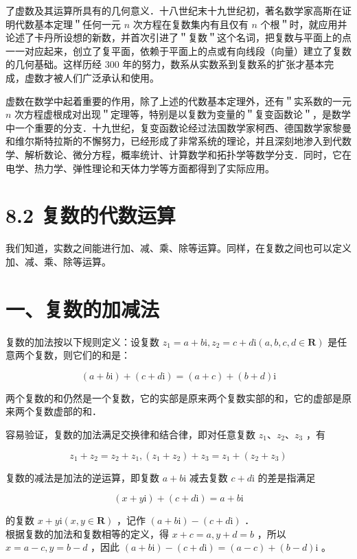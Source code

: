 \documentclass[10pt]{article}
\begin{document}
了虚数及其运算所具有的几何意义．十八世纪末十九世纪初，著名数学家高斯在证明代数基本定理＂任何一元 \(n\) 次方程在复数集内有且仅有 \(n\) 个根＂时，就应用并论述了卡丹所设想的新数，并首次引进了＂复数＂这个名词，把复数与平面上的点一一对应起来，创立了复平面，依赖于平面上的点或有向线段（向量）建立了复数的几何基础。这样历经 300 年的努力，数系从实数系到复数系的扩张才基本完成，虚数才被人们广泛承认和使用。

虚数在数学中起着重要的作用，除了上述的代数基本定理外，还有＂实系数的一元 \(n\) 次方程虚根成对出现＂定理等，特别是以复数为变量的＂复变函数论＂，是数学中一个重要的分支．十九世纪，复变函数论经过法国数学家柯西、德国数学家黎曼和维尔斯特拉斯的不懈努力，已经形成了非常系统的理论，并且深刻地渗入到代数学、解析数论、微分方程，概率统计、计算数学和拓扑学等数学分支．同时，它在电学、热力学、弹性理论和天体力学等方面都得到了实际应用。

\section*{8.2 复数的代数运算}
我们知道，实数之间能进行加、减、乘、除等运算。同样，在复数之间也可以定义加、减、乘、除等运算。

\section*{一、复数的加减法}
复数的加法按以下规则定义：设复数 \(z_{1}=a+b \mathrm{i}, z_{2}=c+d \mathrm{i}(a, b, c, d \in \mathbf{R})\) 是任意两个复数，则它们的和是：

\[
(a+b \mathrm{i})+(c+d \mathrm{i})=(a+c)+(b+d) \mathrm{i}
\]

两个复数的和仍然是一个复数，它的实部是原来两个复数实部的和，它的虚部是原来两个复数虚部的和．

容易验证，复数的加法满足交换律和结合律，即对任意复数 \(z_{1} 、 z_{2} 、 z_{3}\) ，有

\[
z_{1}+z_{2}=z_{2}+z_{1},\left(z_{1}+z_{2}\right)+z_{3}=z_{1}+\left(z_{2}+z_{3}\right)
\]

复数的减法是加法的逆运算，即复数 \(a+b \mathrm{i}\) 减去复数 \(c+d \mathrm{i}\) 的差是指满足

\[
(x+y \mathrm{i})+(c+d \mathrm{i})=a+b \mathrm{i}
\]

的复数 \(x+y \mathrm{i}(x, y \in \mathbf{R})\) ，记作 \((a+b \mathrm{i})-(c+d \mathrm{i})\) ．\\
根据复数的加法和复数相等的定义，得 \(x+c=a, y+d=b\) ，所以 \(x=a-c, y=b-d\) ，因此 \((a+b \mathrm{i})-(c+d \mathrm{i})=(a-c)+(b-d) \mathrm{i}\) 。
\end{document}
